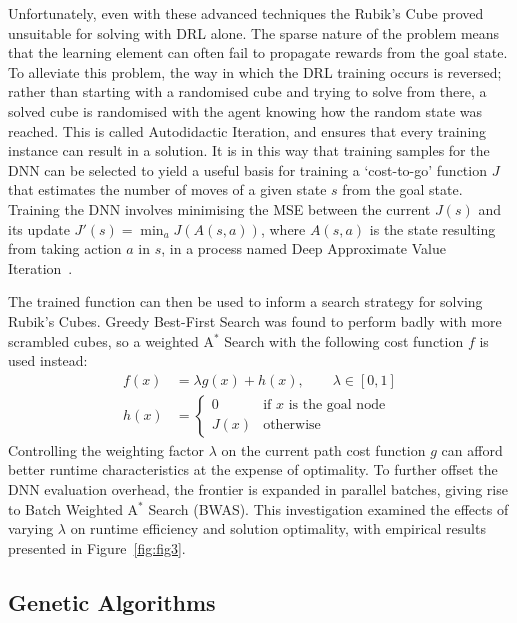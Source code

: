 \documentclass[UKenglish]{svproc}
\begin{document}
Unfortunately, even with these advanced techniques the Rubik's Cube proved unsuitable for solving with DRL alone. The sparse nature of the problem means that the learning element can often fail to propagate rewards from the goal state. To alleviate this problem, the way in which the DRL training occurs is reversed; rather than starting with a randomised cube and trying to solve from there, a solved cube is randomised with the agent knowing how the random state was reached. This is called Autodidactic Iteration, and ensures that every training instance can result in a solution. It is in this way that training samples for the DNN can be selected to yield a useful basis for training a `cost-to-go' function $J$ that estimates the number of moves of a given state $s$ from the goal state. Training the DNN involves minimising the MSE between the current $J(s)$ and its update $J'(s)=\min_aJ(A(s,a))$, where $A(s,a)$ is the state resulting from taking action $a$ in $s$, in a process named Deep Approximate Value Iteration~\cite{agostinelli2019solving}.

The trained function can then be used to inform a search strategy for solving Rubik's Cubes. Greedy Best-First Search was found to perform badly with more scrambled cubes, so a weighted A$^\ast$ Search with the following cost function $f$ is used instead:
\begin{align*}
  f(x)&=\lambda g(x)+h(x),\qquad\lambda\in [0,1] \\
  h(x)&=\begin{cases}
    0    & \text{if $x$ is the goal node} \\
    J(x) & \text{otherwise}
  \end{cases}
\end{align*}
Controlling the weighting factor $\lambda$ on the current path cost function $g$ can afford better runtime characteristics at the expense of optimality. To further offset the DNN evaluation overhead, the frontier is expanded in parallel batches, giving rise to Batch Weighted A$^\ast$ Search (BWAS).  This investigation examined the effects of varying $\lambda$ on runtime efficiency and solution optimality, with empirical results presented in Figure~\ref{fig:fig3}.

\subsection{Genetic Algorithms}
\end{document}
